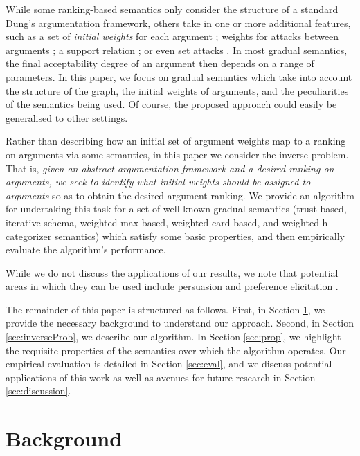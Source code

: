 \documentclass{article}
\begin{document}
While some ranking-based semantics \cite{amgoud_ranking-based_2013,bonzon_comparative_2016,delobelle_ranking-based_2017,amgoud_ranking_2016} only consider the structure of a standard Dung's argumentation framework, others take in one or more additional features, such as a set of \emph{initial weights} for each argument \cite{TB-sem,AMGOUD2022103607}; weights for attacks between arguments \cite{coste-marquis_weighted_2012,yun_2021_gradual}; a support relation \cite{mossakowski_modular_2018,mossakowski_bipolar_2016,rago_discontinuity-free_2016}; or  even set attacks \cite{yun_ranking-based_2020}. In most gradual semantics, the final acceptability degree of an argument then depends on a range of parameters. In this paper, we focus on gradual semantics which take into account the structure of the graph, the initial weights of arguments, and the peculiarities of the semantics being used. Of course, the proposed approach could easily be generalised to other settings.

Rather than describing how an initial set of argument weights map to a ranking on arguments via some semantics, in this paper we consider the inverse problem. That is, \emph{given an abstract argumentation framework and a desired ranking on arguments, we seek to identify what initial weights should be assigned to arguments} so as to obtain the desired argument ranking. We provide an algorithm for undertaking this task for a set of well-known gradual semantics (trust-based, iterative-schema, weighted max-based, weighted card-based, and weighted h-categorizer semantics) which satisfy some basic properties, and then empirically evaluate the algorithm's performance.

While we do not discuss the applications of our results, we note that potential areas in which they can be used include persuasion \cite{POLBERG2018487} and preference elicitation \cite{mahesar18computing}.

The remainder of this paper is structured as follows. First, in Section \ref{sec:background}, we provide the necessary background to understand our approach. Second, in Section \ref{sec:inverseProb}, we describe our algorithm. In Section \ref{sec:prop}, we highlight the requisite properties of the semantics over which the algorithm operates. Our empirical evaluation is detailed in Section \ref{sec:eval}, and we discuss potential applications of this work as well as avenues for future research in Section \ref{sec:discussion}.

\section{Background} \label{sec:background}
\end{document}
